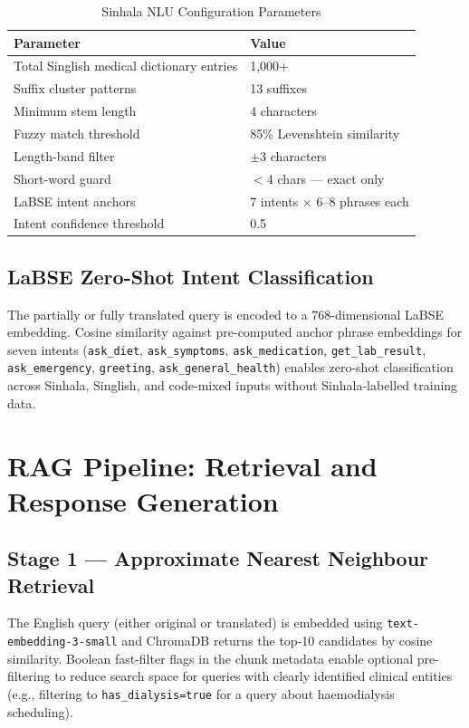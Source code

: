 \documentclass[12pt,a4paper]{report}
\begin{document}
\begin{table}[H]
\centering
\caption{Sinhala NLU Configuration Parameters}
\label{tab:sinhala_params}
\renewcommand{\arraystretch}{1.3}
\begin{tabularx}{\textwidth}{@{}Xl@{}}
\toprule
\textbf{Parameter} & \textbf{Value} \\
\midrule
Total Singlish medical dictionary entries & 1,000+ \\
Suffix cluster patterns & 13 suffixes \\
Minimum stem length & 4 characters \\
Fuzzy match threshold & 85\% Levenshtein similarity \\
Length-band filter & $\pm$3 characters \\
Short-word guard & $<$4 chars --- exact only \\
LaBSE intent anchors & 7 intents $\times$ 6--8 phrases each \\
Intent confidence threshold & 0.5 \\
\bottomrule
\end{tabularx}
\end{table}

\subsection{LaBSE Zero-Shot Intent Classification}

The partially or fully translated query is encoded to a 768-dimensional LaBSE embedding. Cosine similarity against pre-computed anchor phrase embeddings for seven intents (\texttt{ask\_diet}, \texttt{ask\_symptoms}, \texttt{ask\_medication}, \texttt{get\_lab\_result}, \texttt{ask\_emergency}, \texttt{greeting}, \texttt{ask\_general\_health}) enables zero-shot classification across Sinhala, Singlish, and code-mixed inputs without Sinhala-labelled training data.

\section{RAG Pipeline: Retrieval and Response Generation}

\subsection{Stage 1 — Approximate Nearest Neighbour Retrieval}

The English query (either original or translated) is embedded using \texttt{text-embedding-3-small} and ChromaDB returns the top-10 candidates by cosine similarity. Boolean fast-filter flags in the chunk metadata enable optional pre-filtering to reduce search space for queries with clearly identified clinical entities (e.g., filtering to \texttt{has\_dialysis=true} for a query about haemodialysis scheduling).
\end{document}
